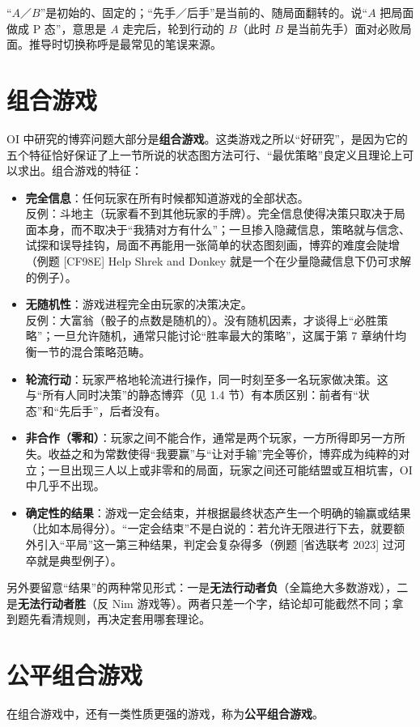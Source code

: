 \documentclass[UTF8,a4paper,11pt,oneside,openany,fontset=fandol]{ctexbook}
\theoremstyle{definition}
\begin{document}
\begin{pitfall}[两套称呼不要混用]
“$A$／$B$”是初始的、固定的；“先手／后手”是当前的、随局面翻转的。说“$A$ 把局面做成 P 态”，意思是 $A$ 走完后，轮到行动的 $B$（此时 $B$ 是当前先手）面对必败局面。推导时切换称呼是最常见的笔误来源。
\end{pitfall}

\section{组合游戏}
OI 中研究的博弈问题大部分是\textbf{组合游戏}。这类游戏之所以“好研究”，是因为它的五个特征恰好保证了上一节所说的状态图方法可行、“最优策略”良定义且理论上可以求出。组合游戏的特征：
\begin{itemize}
\item \textbf{完全信息}：任何玩家在所有时候都知道游戏的全部状态。\\
反例：斗地主（玩家看不到其他玩家的手牌）。完全信息使得决策只取决于局面本身，而不取决于“我猜对方有什么”；一旦掺入隐藏信息，策略就与信念、试探和误导挂钩，局面不再能用一张简单的状态图刻画，博弈的难度会陡增（例题 [CF98E] Help Shrek and Donkey 就是一个在少量隐藏信息下仍可求解的例子）。
\item \textbf{无随机性}：游戏进程完全由玩家的决策决定。\\
反例：大富翁（骰子的点数是随机的）。没有随机因素，才谈得上“必胜策略”；一旦允许随机，通常只能讨论“胜率最大的策略”，这属于第 7 章纳什均衡一节的混合策略范畴。
\item \textbf{轮流行动}：玩家严格地轮流进行操作，同一时刻至多一名玩家做决策。这与“所有人同时决策”的静态博弈（见 1.4 节）有本质区别：前者有“状态”和“先后手”，后者没有。
\item \textbf{非合作（零和）}：玩家之间不能合作，通常是两个玩家，一方所得即另一方所失。收益之和为常数使得“我要赢”与“让对手输”完全等价，博弈成为纯粹的对立；一旦出现三人以上或非零和的局面，玩家之间还可能结盟或互相坑害，OI 中几乎不出现。
\item \textbf{确定性的结果}：游戏一定会结束，并根据最终状态产生一个明确的输赢或结果（比如本局得分）。“一定会结束”不是白说的：若允许无限进行下去，就要额外引入“平局”这一第三种结果，判定会复杂得多（例题 [省选联考 2023] 过河卒就是典型例子）。
\end{itemize}

另外要留意“结果”的两种常见形式：一是\textbf{无法行动者负}（全篇绝大多数游戏），二是\textbf{无法行动者胜}（反 Nim 游戏等）。两者只差一个字，结论却可能截然不同；拿到题先看清规则，再决定套用哪套理论。

\section{公平组合游戏}
在组合游戏中，还有一类性质更强的游戏，称为\textbf{公平组合游戏}。
\end{document}
